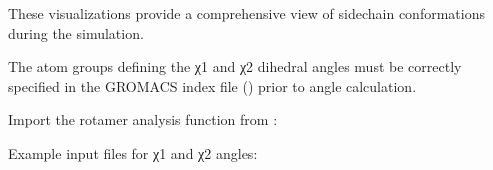 \documentclass[a4paper,10pt,english]{sphinxmanual}
\begin{document}
\sphinxAtStartPar
These visualizations provide a comprehensive view of side\sphinxhyphen{}chain conformations during the simulation.

\sphinxAtStartPar
{} The atom groups defining the χ1 and χ2 dihedral angles must be correctly specified in the GROMACS index file () prior to angle calculation.

\sphinxAtStartPar
{}

\sphinxAtStartPar
Import the rotamer analysis function from :

\begin{sphinxVerbatim}[commandchars=\\\{\}]
 
\end{sphinxVerbatim}

\sphinxAtStartPar
Example input files for χ1 and χ2 angles:
\end{document}
